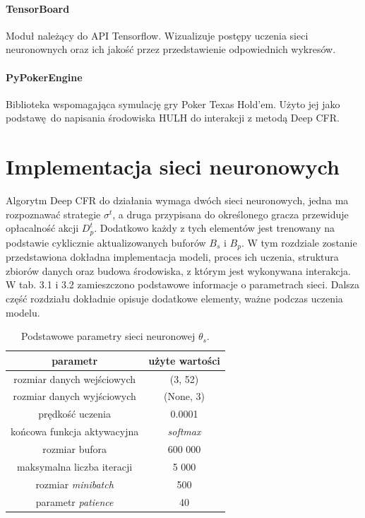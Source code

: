\documentclass[12pt,oneside,a4paper]{report}
\begin{document}
\paragraph{TensorBoard}
Moduł należący do API Tensorflow. Wizualizuje postępy uczenia sieci neuronownych oraz ich 
jakość przez przedstawienie odpowiednich wykresów. 


\paragraph{PyPokerEngine}

Biblioteka wspomagająca symulację gry Poker Texas Hold'em.
Użyto jej jako podstawę do napisania środowiska HULH do interakcji z 
metodą Deep CFR.

\section{Implementacja sieci neuronowych}

Algorytm Deep CFR do działania wymaga dwóch sieci neuronowych, jedna ma rozpoznawać strategie
$\sigma^{t}$, a
druga przypisana do określonego gracza przewiduje opłacalność akcji $D_{p}^{t}$. 
Dodatkowo każdy z tych elementów
jest trenowany na podstawie cyklicznie aktualizowanych buforów $B_{s}$ i $B_{p}$. W tym rozdziale zostanie
przedstawiona dokładna implementacja modeli, proces ich uczenia, struktura zbiorów danych oraz
budowa środowiska, z którym jest wykonywana interakcja. W tab. 3.1 i 3.2 zamieszczono podstawowe 
informacje
o parametrach sieci. Dalsza część rozdziału dokładnie opisuje dodatkowe elementy, ważne podczas
uczenia modelu.

\vspace{1cm}
\begin{table}[h!]
\centering
\caption{Podstawowe parametry sieci neuronowej $\theta_{s}$.}
\begin{tabular}{|c|c| }
   \hline
   parametr & użyte wartości \\
    \hline
   rozmiar danych wejściowych & (3, 52) \\
   \hline
   rozmiar danych wyjściowych & (None, 3) \\  
   \hline
   prędkość uczenia & 0.0001 \\
   \hline
   końcowa funkcja aktywacyjna & \emph{softmax} \\
   \hline
   rozmiar bufora & 600 000 \\
   \hline
   maksymalna liczba iteracji & 5 000 \\
   \hline
   rozmiar \emph{minibatch} &  500\\
   \hline
   parametr \emph{patience} &  40\\
   \hline
\end{tabular}
\end{table}
\end{document}
